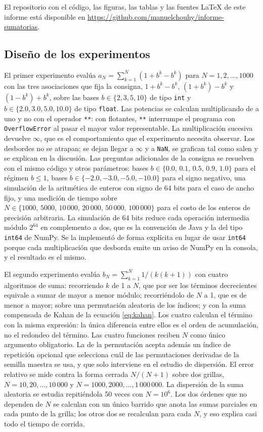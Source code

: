 El repositorio con el código, las figuras, las tablas y las fuentes \LaTeX{} de este informe está
disponible en \url{https://github.com/manuelchouhy/informe-sumatorias}.

\subsection{Diseño de los experimentos}
\label{subsec:diseno}

El primer experimento evalúa $a_N = \sum_{k=1}^{N} (1 + b^{k} - b^{k})$ para
$N = 1, 2, \ldots, 1000$ con las tres asociaciones que fija la consigna,
$1 + b^{k} - b^{k}$, $(1 + b^{k}) - b^{k}$ y $(1 - b^{k}) + b^{k}$, sobre las bases
$b \in \{2, 3, 5, 10\}$ de tipo \texttt{int} y $b \in \{2.0, 3.0, 5.0, 10.0\}$ de tipo
\texttt{float}. Las potencias se calculan multiplicando de a uno y no con el operador
\texttt{**}: con flotantes, \texttt{**} interrumpe el programa con \texttt{OverflowError} al pasar
el mayor valor representable. La multiplicación sucesiva devuelve $\infty$, que es el comportamiento
que el experimento necesita observar. Los desbordes no se atrapan; se dejan llegar a
$\infty$ y a \texttt{NaN}, se grafican tal como salen y se explican en la discusión. Las preguntas
adicionales de la consigna se resuelven con el mismo código y otros parámetros: bases
$b \in \{0.0,\, 0.1,\, 0.5,\, 0.9,\, 1.0\}$ para el régimen $b \le 1$, bases
$b \in \{-2.0, -3.0, -5.0, -10.0\}$ para el signo negativo, una simulación de la aritmética de
enteros con signo de 64 bits para el caso de ancho fijo, y una medición de tiempo sobre
$N \in \{1000,\, 5000,\, 10\,000,\, 20\,000,\, 50\,000,\, 100\,000\}$ para el costo de los enteros
de precisión arbitraria. La simulación de 64 bits reduce cada operación intermedia módulo $2^{64}$
en complemento a dos, que es la convención de Java y la del tipo \texttt{int64} de NumPy. Se la
implementó de forma explícita en lugar de usar \texttt{int64} porque cada multiplicación que
desborda emite un aviso de NumPy en la consola, y el resultado es el mismo.

El segundo experimento evalúa $b_N = \sum_{k=1}^{N} 1/(k(k+1))$ con cuatro algoritmos de suma:
recorriendo $k$ de 1 a $N$, que por ser los términos decrecientes equivale a sumar de mayor a menor
módulo; recorriéndolo de $N$ a 1, que es de menor a mayor; sobre una permutación aleatoria de los
índices; y con la suma compensada de Kahan de la ecuación \eqref{eq:kahan}. Los cuatro calculan el
término con la misma expresión: la única diferencia entre ellos es el orden de acumulación, no el
redondeo del término. Las cuatro funciones reciben $N$ como único argumento obligatorio. La de la
permutación acepta además un índice de repetición opcional que selecciona cuál de las permutaciones
derivadas de la semilla maestra se usa, y que solo interviene en el estudio de dispersión. El error relativo se mide contra la forma cerrada
$N/(N+1)$ sobre dos grillas, $N = 10, 20, \ldots, 10\,000$ y
$N = 1000, 2000, \ldots, 1\,000\,000$. La dispersión de la suma aleatoria se estudia repitiéndola
50 veces con $N = 10^{6}$. Los dos órdenes que no dependen de $N$ se calculan con un único barrido
que anota las sumas parciales en cada punto de la grilla; los otros dos se recalculan para cada
$N$, y eso explica casi todo el tiempo de corrida.

